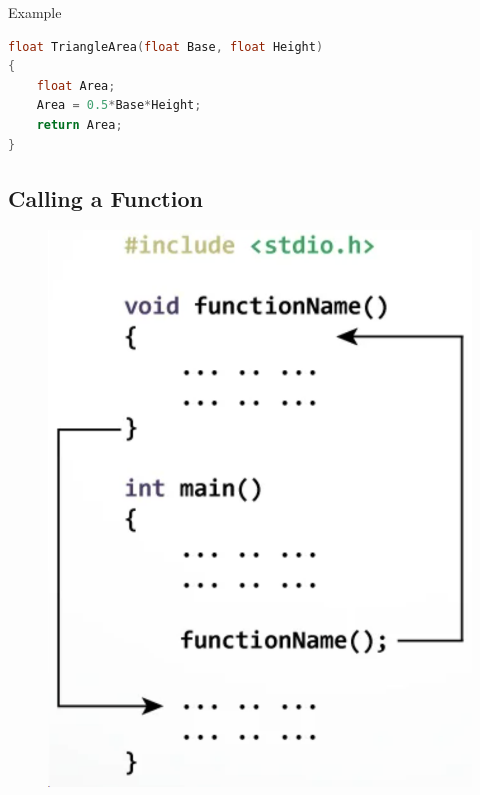 Example

\begin{lstlisting}[language=c]
float TriangleArea(float Base, float Height)
{
	float Area;
	Area = 0.5*Base*Height;
	return Area;
}
\end{lstlisting}


\subsection{Calling a Function}

\begin{figure}[H]
	\centering
	\includegraphics[width=0.45\linewidth]{../P3/img/screenshot005.png}
	\caption{}
	\label{fig:memanggilfungsi}
\end{figure}

